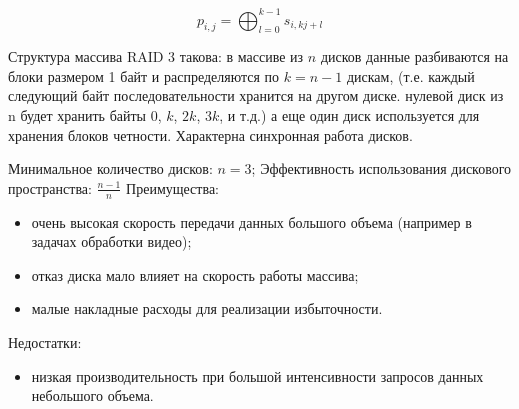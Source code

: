 \[p_{i,j}=\bigoplus_{l=0}^{k-1}s_{i,kj+l}\]

Структура массива RAID 3 такова: в массиве из $n$ дисков данные разбиваются на блоки размером 1 байт и распределяются по $k = n-1$ дискам, (т.е. каждый следующий байт последовательности хранится на другом диске. нулевой диск из n будет хранить байты $0$, $k$, $2k$, $3k$, и т.д.) а еще один диск используется для хранения блоков четности. Характерна синхронная работа дисков.

Минимальное количество дисков: $n=3$; Эффективность использования дискового пространства: $\frac{n-1}{n}$
Преимущества:
\begin{itemize}
    \item очень высокая скорость передачи данных большого объема (например в задачах обработки видео);
    \item отказ диска мало влияет на скорость работы массива;
    \item малые накладные расходы для реализации избыточности. 
\end{itemize}

Недостатки:
\begin{itemize}
    \item низкая производительность при большой интенсивности запросов данных небольшого объема.
\end{itemize}


